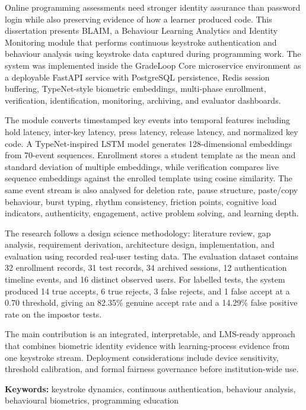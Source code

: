 \begin{singlespace}
\fontsize{11}{14}\selectfont

Online programming assessments need stronger identity assurance than password login while also preserving evidence of how a learner produced code. This dissertation presents BLAIM, a Behaviour Learning Analytics and Identity Monitoring module that performs continuous keystroke authentication and behaviour analysis using keystroke data captured during programming work. The system was implemented inside the GradeLoop Core microservice environment as a deployable FastAPI service with PostgreSQL persistence, Redis session buffering, TypeNet-style biometric embeddings, multi-phase enrollment, verification, identification, monitoring, archiving, and evaluator dashboards.

The module converts timestamped key events into temporal features including hold latency, inter-key latency, press latency, release latency, and normalized key code. A TypeNet-inspired LSTM model generates 128-dimensional embeddings from 70-event sequences. Enrollment stores a student template as the mean and standard deviation of multiple embeddings, while verification compares live sequence embeddings against the enrolled template using cosine similarity. The same event stream is also analysed for deletion rate, pause structure, paste/copy behaviour, burst typing, rhythm consistency, friction points, cognitive load indicators, authenticity, engagement, active problem solving, and learning depth.

The research follows a design science methodology: literature review, gap analysis, requirement derivation, architecture design, implementation, and evaluation using recorded real-user testing data. The evaluation dataset contains 32 enrollment records, 31 test records, 34 archived sessions, 12 authentication timeline events, and 16 distinct observed users. For labelled tests, the system produced 14 true accepts, 6 true rejects, 3 false rejects, and 1 false accept at a 0.70 threshold, giving an 82.35\% genuine accept rate and a 14.29\% false positive rate on the impostor tests.

The main contribution is an integrated, interpretable, and LMS-ready approach that combines biometric identity evidence with learning-process evidence from one keystroke stream. Deployment considerations include device sensitivity, threshold calibration, and formal fairness governance before institution-wide use.

\bigskip

\noindent\textbf{Keywords:} keystroke dynamics, continuous authentication, behaviour analysis, behavioural biometrics, programming education

\end{singlespace}
\clearpage
